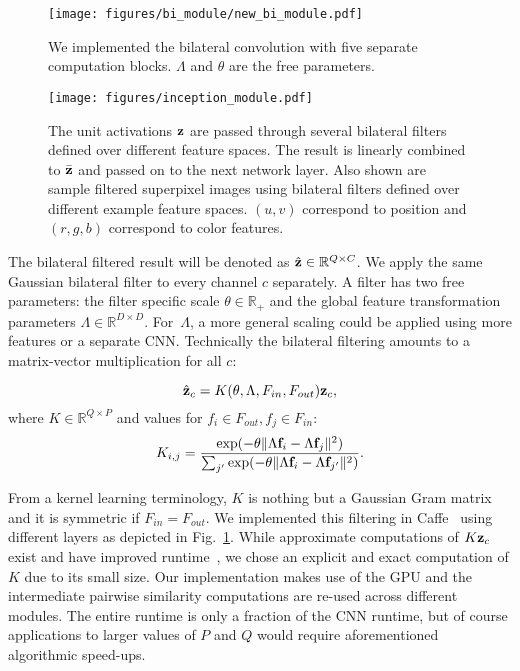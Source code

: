 \begin{figure}[t]
\begin{center}
\centerline{\texttt{[image: figures/bi\_module/new\_bi\_module.pdf]}}
   {
We implemented the bilateral convolution with five separate computation blocks. $\Lambda$ and $\theta$
are the free parameters.}\label{fig:bi_module}
\end{center}
\end{figure}

\begin{figure}[t]
\begin{center}
\centerline{\texttt{[image: figures/inception\_module.pdf]}}
   {The unit activations $\mathbf{z}$
    are passed through several bilateral filters defined over different feature spaces. The result
  is linearly combined to $\bar{\mathbf{z}}$ and passed on to the next network layer. Also shown are sample
  filtered superpixel images using bilateral filters defined over different example feature spaces. $(u,v)$ correspond to position and $(r,g,b)$ correspond to color features.}\label{fig:inception}
\end{center}
\end{figure}

The bilateral filtered result will be denoted as $\hat{\mathbf{z}}\in\mathbb{R}^{Q\times C}$.
We apply the same Gaussian bilateral filter to every channel $c$ separately.
A filter has two free parameters: the filter specific scale $\theta\in\mathbb{R}_+$ and the
global feature transformation parameters $\Lambda\in\mathbb{R}^{D\times D}$.
For~$\Lambda$, a more general scaling could be applied using more features or a separate CNN.
Technically the bilateral filtering amounts to a matrix-vector multiplication for all $c$:

\begin{equation}
\hat{\mathbf{z}}_c = K(\theta, \Lambda, F_{in}, F_{out}) \mathbf{z}_c,
\label{eq:filter}
\end{equation}
where $K\in\mathbb{R}^{Q\times P}$ and values for $f_i\in F_{out}, f_j\in F_{in}$:
\begin{equation}
K_{i,j} = \frac{\exp(-\theta\|\Lambda \mathbf{f}_i- \Lambda \mathbf{f}_j\|^2)}{\sum_{j'}\exp(-\theta\|\Lambda \mathbf{f}_i- \Lambda \mathbf{f}_{j'}\|^2)}.
\label{eq:filter}
\end{equation}

From a kernel learning terminology, $K$ is nothing but a Gaussian Gram matrix and it is symmetric if $F_{in}=F_{out}$.
We implemented this filtering in Caffe~\cite{jia2014caffe} using different layers as depicted in Fig.~\ref{fig:bi_module}.
While approximate computations of $K\mathbf{z}_c$ exist and have improved
runtime~\cite{adams2010fast,paris2006fast,gastal2011domain,adams2009gaussian}, we chose an explicit and exact computation of $K$ due to its small size.
Our implementation makes use of the GPU and the intermediate pairwise similarity computations are re-used across different
modules. The entire runtime is only a fraction of the CNN runtime, but of course applications to larger values of $P$ and $Q$
would require aforementioned algorithmic speed-ups.

